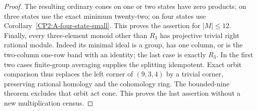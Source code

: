 \begin{proof}
The resulting ordinary cones on one or two states
have zero products; on three states use the exact
minimum twenty-two; on four states use
Corollary~\ref{CP2:A-four-state-small}. This proves
the assertion for $|M|\leq12$.
Finally, every three-element monoid other than
$R_3$ has projective trivial right rational module.
Indeed its minimal ideal is a group, has one column,
or is the two-column one-row band with an identity;
the last case is exactly $R_3$. In the first two
cases finite-group averaging supplies the splitting
idempotent. Exact orbit comparison thus replaces
the left corner of $(9,3,4)$ by a trivial corner,
preserving rational homology and the cohomology ring.
The bounded-nine theorem excludes that orbit act
cone. This proves the last assertion without a
new multiplication census.
\end{proof}

